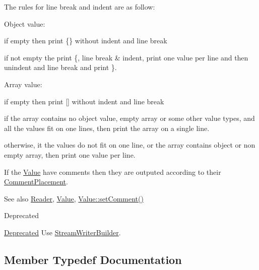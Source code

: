 The rules for line break and indent are as follow\+:
\begin{DoxyItemize}
\item Object value\+:
\begin{DoxyItemize}
\item if empty then print \{\} without indent and line break
\item if not empty the print \textquotesingle{}\{\textquotesingle{}, line break \& indent, print one value per line and then unindent and line break and print \textquotesingle{}\}\textquotesingle{}.
\end{DoxyItemize}
\item Array value\+:
\begin{DoxyItemize}
\item if empty then print \mbox{[}\mbox{]} without indent and line break
\item if the array contains no object value, empty array or some other value types, and all the values fit on one lines, then print the array on a single line.
\item otherwise, it the values do not fit on one line, or the array contains object or non empty array, then print one value per line.
\end{DoxyItemize}
\end{DoxyItemize}

If the \hyperlink{classJson_1_1Value}{Value} have comments then they are outputed according to their \hyperlink{namespaceJson_a4fc417c23905b2ae9e2c47d197a45351}{Comment\+Placement}.

\begin{DoxySeeAlso}{See also}
\hyperlink{classJson_1_1Reader}{Reader}, \hyperlink{classJson_1_1Value}{Value}, \hyperlink{classJson_1_1Value_a29f3a30f7e5d3af6f38d57999bf5b480}{Value\+::set\+Comment()} 
\end{DoxySeeAlso}
\begin{DoxyRefDesc}{Deprecated}
\item[\hyperlink{deprecated__deprecated000009}{Deprecated}]Use \hyperlink{classJson_1_1StreamWriterBuilder}{Stream\+Writer\+Builder}. \end{DoxyRefDesc}


\subsection{Member Typedef Documentation}

